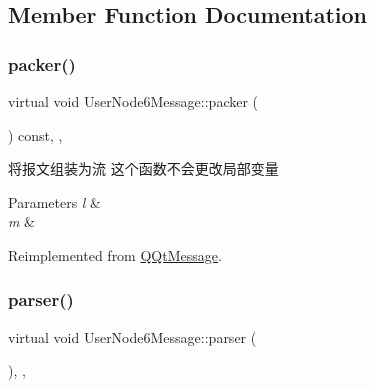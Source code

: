\subsection{Member Function Documentation}
\mbox{\label{class_user_node6_message_a01e9871b932acec420b34c8c77746715}} 
\subsubsection{\texorpdfstring{packer()}{packer()}}
{\footnotesize\ttfamily virtual void User\+Node6\+Message\+::packer (\begin{DoxyParamCaption}\item[{Q\+Byte\+Array \&}]{ }\end{DoxyParamCaption}) const\hspace{0.3cm}{\ttfamily [inline]}, {\ttfamily [override]}, {\ttfamily [virtual]}}



将报文组装为流 这个函数不会更改局部变量 


\begin{DoxyParams}{Parameters}
{\em l} & \\
\hline
{\em m} & \\
\hline
\end{DoxyParams}


Reimplemented from \mbox{\hyperlink{class_q_qt_message_af1885c2c3628495808dca66ee8d72e14}{Q\+Qt\+Message}}.

\mbox{\label{class_user_node6_message_a4970e84895482289ed59f6425404eb5e}} 
\subsubsection{\texorpdfstring{parser()}{parser()}}
{\footnotesize\ttfamily virtual void User\+Node6\+Message\+::parser (\begin{DoxyParamCaption}\item[{const Q\+Byte\+Array \&}]{ }\end{DoxyParamCaption})\hspace{0.3cm}{\ttfamily [inline]}, {\ttfamily [override]}, {\ttfamily [virtual]}}



